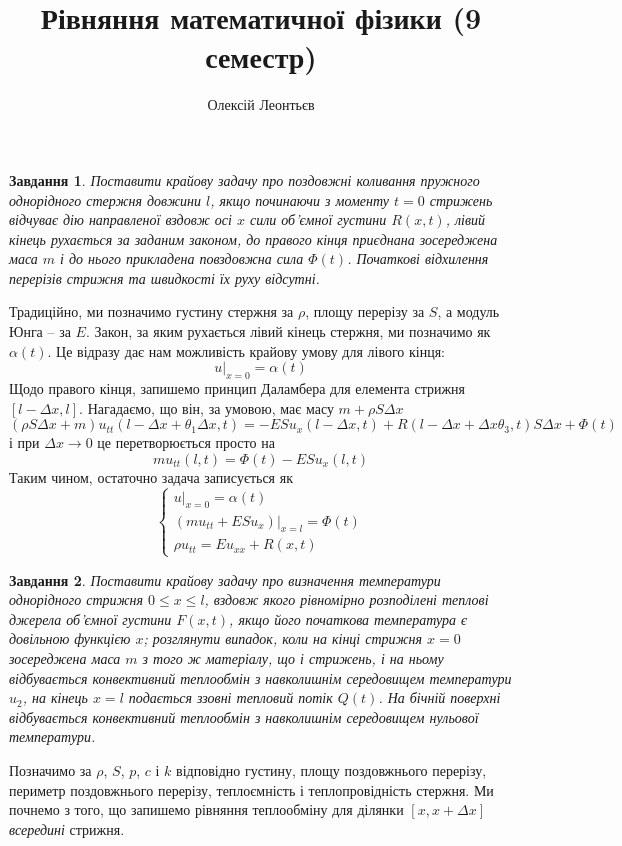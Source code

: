 \documentclass[12pt]{article} %
\title{Рівняння математичної фізики (9 семестр)}
\author{Олексій Леонтьєв}
\newtheorem{prob}{Завдання}
\newcommand{\dt}{\;dt}
\newcommand{\dx}{\;dx}
\begin{document}
\def\dx{\Delta x}
\def\dt{\Delta t}
\def\dX{\frac{\partial}{\partial x}}
\maketitle
\begin{prob}Поставити крайову задачу про поздовжні коливання пружного однорідного стержня довжини $l$, якщо починаючи з моменту
$t=0$ стрижень відчуває дію направленої вздовж осі $x$ сили об’ємної густини $R(x,t)$, лівий кінець рухається за заданим законом,
до правого кінця приєднана зосереджена маса $m$ і до нього прикладена повздовжна сила $\Phi(t)$. Початкові відхилення перерізів стрижня та
швидкості їх руху відсутні.\end{prob}
Традиційно, ми позначимо густину стержня за $\rho$, площу перерізу за $S$, а модуль Юнга -- за $E$. Закон, за яким рухається лівий кінець стержня,
ми позначимо як $\alpha(t)$. Це відразу дає нам можливість крайову умову для лівого кінця:
\[u\big|_{x=0}=\alpha(t)\]
Щодо правого кінця, запишемо принцип Даламбера для елемента стрижня $[l-\Delta x,l]$. Нагадаємо, що він, за умовою, має масу $m+\rho S\Delta x$
\[(\rho S\Delta x+m) u_{tt}(l-\Delta x+\theta_1\Delta x,t)=-ESu_x(l-\Delta x,t)+R(l-\Delta x+\Delta x\theta_3,t)S\Delta x+\Phi(t)\]
і при $\Delta x\to0$ це перетворюється просто на
\[m u_{tt}(l,t)=\Phi(t)-ESu_x(l,t)\]
Таким чином, остаточно задача записується як
\[\begin{cases}
u\big|_{x=0}=\alpha(t)\\
(m u_{tt}+ESu_x)\big|_{x=l}=\Phi(t)\\
\rho u_{tt}=Eu_{xx}+R(x,t)
\end{cases}\]
\begin{prob}Поставити крайову задачу про визначення температури однорідного стрижня $0\leq x\leq l$, вздовж якого рівномірно розподілені теплові
	джерела об’ємної густини $F(x,t)$, якщо його початкова температура є довільною функцією $x$; розглянути випадок, коли на кінці стрижня
	$x=0$ зосереджена маса $m$ з того ж матеріалу, що і стрижень, і на ньому відбувається конвективний теплообмін з навколишнім середовищем 
	температури $u_2$, на кінець $x=l$ подається ззовні тепловий потік $Q(t)$. На бічній поверхні відбувається конвективний теплообмін з 
	навколишнім середовищем нульової температури.
\end{prob}
Позначимо за $\rho$, $S$, $p$, $c$ і $k$ відповідно густину, площу поздовжнього перерізу, периметр поздовжнього перерізу, теплоємність і 
теплопровідність стержня. Ми почнемо з того, що запишемо рівняння теплообміну для ділянки $[x,x+\dx]$ \textit{всередині} стрижня.
\end{document}
